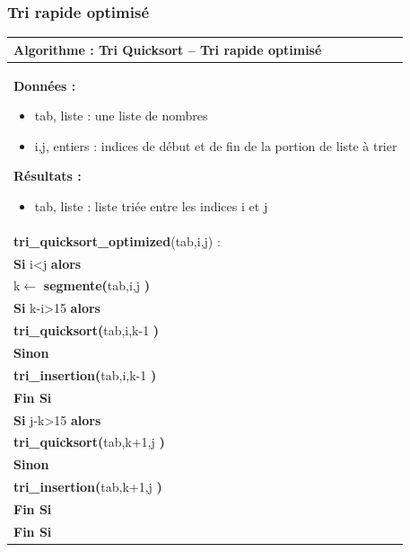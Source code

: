 \documentclass[10pt]{article}
\begin{document}
\subsubsection{Tri rapide optimisé}

\begin{pseudo}
\begin{center}
\begin{tabular}{p{}}
\hline
\textbf{Algorithme :} Tri Quicksort -- Tri rapide optimisé\\
\hline
\textbf{Données :}
\begin{itemize}
\item \textsf{tab}, liste : une liste de nombres
\item \textsf{i,j}, entiers : indices de début et de fin de la portion de liste à trier
\end{itemize}
\textbf{Résultats :} 
\begin{itemize}
\item \textsf{tab}, liste : liste triée entre les indices \textsf{i} et \textsf{j}
\end{itemize}
\\
\textbf{tri\_quicksort\_optimized}(\textsf{tab,i,j}) :\\
\hspace{.4cm} \textbf{Si} \textsf{i<j} \textbf{alors} \\
\hspace{.8cm} \textsf{k$\leftarrow$} \textbf{segmente(}\textsf{tab,i,j} \textbf{)} \\
\hspace{.8cm} \textbf{Si} \textsf{k-i>15} \textbf{alors} \\
\hspace{1.2cm} \textbf{tri\_quicksort(}\textsf{tab,i,k-1} \textbf{)} \\
\hspace{.8cm} \textbf{Sinon} \\
\hspace{1.2cm} \textbf{tri\_insertion(}\textsf{tab,i,k-1} \textbf{)} \\
\hspace{.8cm} \textbf{Fin Si} \\
\hspace{.8cm} \textbf{Si} \textsf{j-k>15} \textbf{alors} \\
\hspace{1.2cm} \textbf{tri\_quicksort(}\textsf{tab,k+1,j} \textbf{)} \\
\hspace{.8cm} \textbf{Sinon} \\
\hspace{1.2cm} \textbf{tri\_insertion(}\textsf{tab,k+1,j} \textbf{)} \\
\hspace{.8cm} \textbf{Fin Si} \\
\hspace{.4cm} \textbf{Fin Si} \\
\hline
\end{tabular}
\end{center}
\end{pseudo}
\end{document}
